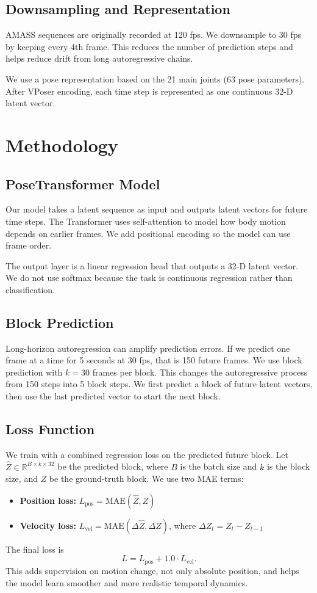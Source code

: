 \documentclass[10pt,twocolumn]{article}
\begin{document}
\subsection{Downsampling and Representation}
AMASS sequences are originally recorded at 120 fps.
We downsample to 30 fps by keeping every 4th frame.
This reduces the number of prediction steps and helps reduce drift from long autoregressive chains.

We use a pose representation based on the 21 main joints (63 pose parameters).
After VPoser encoding, each time step is represented as one continuous 32-D latent vector.

\section{Methodology}
\subsection{PoseTransformer Model}
Our model takes a latent sequence as input and outputs latent vectors for future time steps.
The Transformer uses self-attention to model how body motion depends on earlier frames.
We add positional encoding so the model can use frame order.

The output layer is a linear regression head that outputs a 32-D latent vector.
We do not use softmax because the task is continuous regression rather than classification.

\subsection{Block Prediction}
Long-horizon autoregression can amplify prediction errors.
If we predict one frame at a time for 5 seconds at 30 fps, that is 150 future frames.
We use block prediction with $k=30$ frames per block.
This changes the autoregressive process from 150 steps into 5 block steps.
We first predict a block of future latent vectors, then use the last predicted vector to start the next block.

\subsection{Loss Function}
We train with a combined regression loss on the predicted future block.
Let $\hat{Z}\in\mathbb{R}^{B\times k\times 32}$ be the predicted block, where $B$ is the batch size and $k$ is the block size, and $Z$ be the ground-truth block.
We use two MAE terms:
\begin{itemize}[noitemsep,topsep=2pt]
  \item \textbf{Position loss:} $L_{\text{pos}}=\mathrm{MAE}(\hat{Z}, Z)$
  \item \textbf{Velocity loss:} $L_{\text{vel}}=\mathrm{MAE}(\Delta\hat{Z}, \Delta Z)$, where $\Delta Z_t=Z_t-Z_{t-1}$
\end{itemize}
The final loss is
\[
L = L_{\text{pos}} + 1.0 \cdot L_{\text{vel}}.
\]
This adds supervision on motion change, not only absolute position, and helps the model learn smoother and more realistic temporal dynamics.
\end{document}
